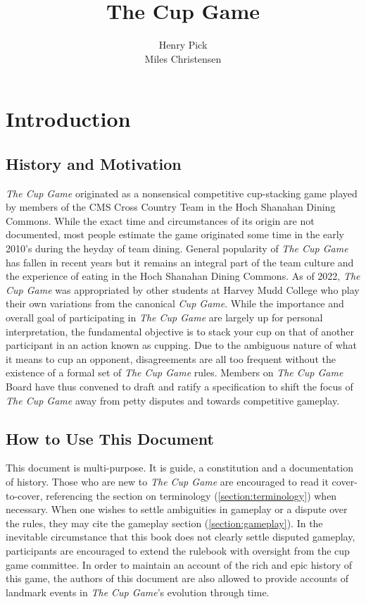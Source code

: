 \documentclass[12pt]{IEEEconf}
\begin{document}
\title{The Cup Game}
\author{Henry Pick\\ Miles Christensen}
\maketitle
\section{Introduction}
\subsection{History and Motivation}
\textit{The Cup Game} originated as a nonsensical competitive cup-stacking game played by members of the CMS Cross Country Team in the Hoch Shanahan Dining Commons. While the exact time and circumstances of its origin are not documented, most people estimate the game originated some time in the early 2010's during the heyday of team dining. General popularity of \textit{The Cup Game} has fallen in recent years but it remains an integral part of the team culture and the experience of eating in the Hoch Shanahan Dining Commons. As of 2022, \textit{The Cup Game} was appropriated by other students at Harvey Mudd College who play their own variations from the canonical \textit{Cup Game}. While the importance and overall goal of participating in \textit{The Cup Game} are largely up for personal interpretation, the fundamental objective is to stack your cup on that of another participant in an action known as cupping. Due to the ambiguous nature of what it means to cup an opponent, disagreements are all too frequent without the existence of a formal set of \textit{The Cup Game} rules. Members on \textit{The Cup Game} Board have thus convened to draft and ratify a specification to shift the focus of \textit{The Cup Game} away from petty disputes and towards competitive gameplay.

\subsection{How to Use This Document}
This document is multi-purpose. It is guide, a constitution and a documentation of history. Those who are new to \textit{The Cup Game} are encouraged to read it cover-to-cover, referencing the section on terminology (\ref{section:terminology}) when necessary. When one wishes to settle ambiguities in gameplay or a dispute over the rules, they may cite the gameplay section (\ref{section:gameplay}). In the inevitable circumstance that this book does not clearly settle disputed gameplay, participants are encouraged to extend the rulebook with oversight from the cup game committee. In order to maintain an account of the rich and epic history of this game, the authors of this document are also allowed to provide accounts of landmark events in \textit{The Cup Game}'s evolution through time.
\end{document}
